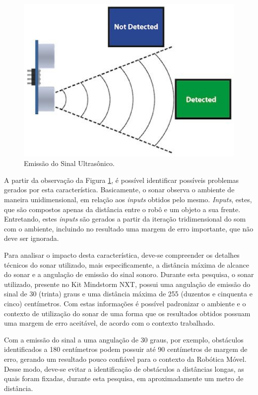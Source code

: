   \begin{figure}[H]
    \centering
    \includegraphics[scale=0.7]{figuras/cone2.eps}
    \caption{Emissão do Sinal Ultrasônico.}
    \label{img:conee}
  \end{figure}

  A partir da observação da Figura \ref{img:conee}, é possível identificar possíveis problemas gerados por esta característica. Basicamente,
  o sonar observa o ambiente de maneira unidimensional, em relação aos \textit{inputs} obtidos pelo mesmo. \textit{Inputs}, estes,
  que são compostos apenas da distância entre o robô e um objeto a sua frente. Entretando, estes \textit{inputs} são gerados a partir
  da iteração tridimensional do som com o ambiente, incluindo no resultado uma margem de erro importante, que não deve ser ignorada.

  Para analisar o impacto desta característica, deve-se compreender os detalhes técnicos do sonar utilizado, mais especificamente,
  a distância máxima de alcance do sonar e a angulação de emissão do sinal sonoro. Durante esta pesquisa, o
  sonar utilizado, presente no Kit Mindstorm NXT, possui uma angulação de emissão do sinal de 30 (trinta) graus e uma distância máxima de
  255 (duzentos e cinquenta e cinco) centímetros. Com estas informações é possível padronizar o ambiente e o contexto de utilização do sonar
  de uma forma que os resultados obtidos possuam uma margem de erro aceitável, de acordo com o contexto trabalhado.

  Com a emissão do sinal a uma angulação de 30 graus, por exemplo, obstáculos identificados a 180 centímetros podem possuir até 90
  centímetros de margem de erro, gerando um resultado pouco confiável para o contexto da Robótica Móvel. Desse modo, deve-se evitar
  a identificação de obstáculos a distâncias longas, as quais foram fixadas, durante esta pesquisa, em aproximadamente um metro de distância.

